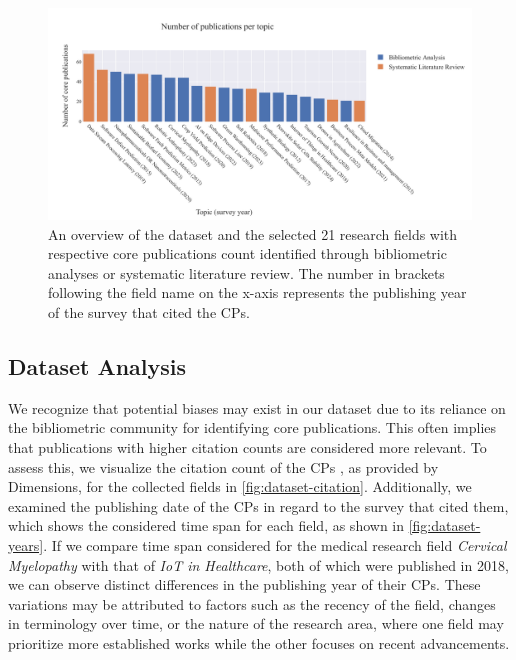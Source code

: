 \begin{figure}
	\centering	
	\includegraphics[scale=0.55]{pics/dataset-overview.pdf}
	\caption[Dataset Overview of the Research Fields]{An overview of the dataset and the selected 21 research fields with respective core publications count identified through bibliometric analyses or systematic literature review. The number in brackets following the field name on the x-axis represents the publishing year of the survey that cited the CPs.}
	\label{fig:dataset-overview}
\end{figure}


\subsection*{Dataset Analysis}

We recognize that potential biases may exist in our dataset due to its reliance on the bibliometric community for identifying core publications. This often implies that publications with higher citation counts are considered more relevant. To assess this, we visualize the citation count of the CPs , as provided by Dimensions, for the collected fields in \autoref{fig:dataset-citation}. Additionally, we examined the publishing date of the CPs in regard to the survey that cited them, which shows the considered time span for each field, as shown in \autoref{fig:dataset-years}.  If we compare time span considered for the medical research field \textit{Cervical Myelopathy} with that of \textit{IoT in Healthcare}, both of which were published in 2018, we can observe distinct differences in the publishing year of their CPs. These variations may be attributed to factors such as the recency of the field, changes in terminology over time, or the nature of the research area, where one field may prioritize more established works while the other focuses on recent advancements.

